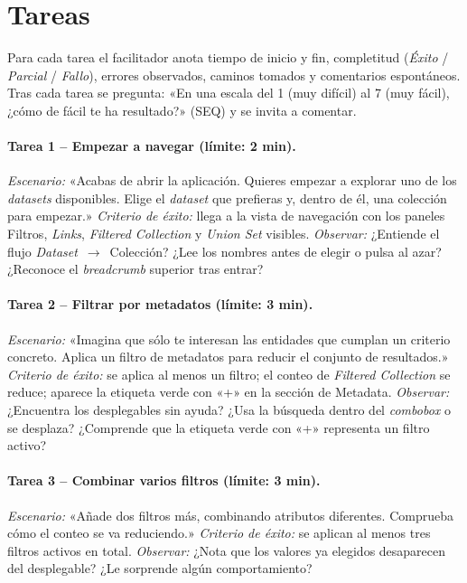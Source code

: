 \section{Tareas}

Para cada tarea el facilitador anota tiempo de inicio y fin, completitud
(\textit{Éxito} / \textit{Parcial} / \textit{Fallo}), errores observados, caminos tomados y
comentarios espontáneos. Tras cada tarea se pregunta: «En una escala del 1 (muy difícil)
al 7 (muy fácil), ¿cómo de fácil te ha resultado?» (SEQ) y se invita a comentar.

\paragraph{Tarea 1 -- Empezar a navegar (límite: 2 min).}
\textit{Escenario:} «Acabas de abrir la aplicación. Quieres empezar a explorar uno de los
\textit{datasets} disponibles. Elige el \textit{dataset} que prefieras y, dentro de él, una
colección para empezar.»
\textit{Criterio de éxito:} llega a la vista de navegación con los paneles Filtros,
\textit{Links}, \textit{Filtered Collection} y \textit{Union Set} visibles.
\textit{Observar:} ¿Entiende el flujo \textit{Dataset}~$\rightarrow$~Colección? ¿Lee los
nombres antes de elegir o pulsa al azar? ¿Reconoce el \textit{breadcrumb} superior tras entrar?

\paragraph{Tarea 2 -- Filtrar por metadatos (límite: 3 min).}
\textit{Escenario:} «Imagina que sólo te interesan las entidades que cumplan un criterio
concreto. Aplica un filtro de metadatos para reducir el conjunto de resultados.»
\textit{Criterio de éxito:} se aplica al menos un filtro; el conteo de \textit{Filtered
Collection} se reduce; aparece la etiqueta verde con «+» en la sección de Metadata.
\textit{Observar:} ¿Encuentra los desplegables sin ayuda? ¿Usa la búsqueda dentro del
\textit{combobox} o se desplaza? ¿Comprende que la etiqueta verde con «+» representa
un filtro activo?

\paragraph{Tarea 3 -- Combinar varios filtros (límite: 3 min).}
\textit{Escenario:} «Añade dos filtros más, combinando atributos diferentes. Comprueba
cómo el conteo se va reduciendo.»
\textit{Criterio de éxito:} se aplican al menos tres filtros activos en total.
\textit{Observar:} ¿Nota que los valores ya elegidos desaparecen del desplegable? ¿Le
sorprende algún comportamiento?

